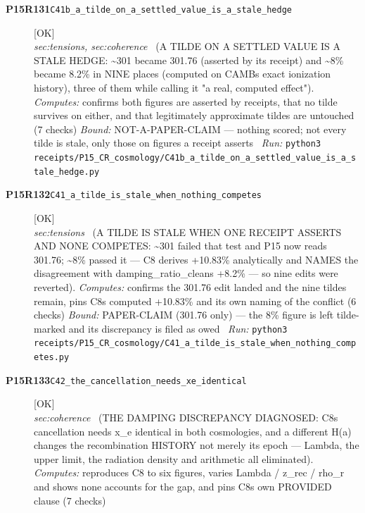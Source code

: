 \begin{description}
\item[\textbf{P15R131}\quad\texttt{C41b\_a\_tilde\_on\_a\_settled\_value\_is\_a\_stale\_hedge}]\hfill\textsf{[OK]}\\
\textit{sec:tensions, sec:coherence} \ (A TILDE ON A SETTLED VALUE IS A STALE HEDGE: \textasciitilde{}301 became 301.76 (asserted by its receipt) and \textasciitilde{}8\% became 8.2\% in NINE places (computed on CAMBs exact ionization history), three of them while calling it "a real, computed effect"). 
\emph{Computes:} confirms both figures are asserted by receipts, that no tilde survives on either, and that legitimately approximate tildes are untouched (7 checks)
 \emph{Bound:} NOT-A-PAPER-CLAIM --- nothing scored; not every tilde is stale, only those on figures a receipt asserts
\ \emph{Run:} \texttt{python3 receipts/P15\_CR\_cosmology/C41b\_a\_tilde\_on\_a\_settled\_value\_is\_a\_stale\_hedge.py}
\item[\textbf{P15R132}\quad\texttt{C41\_a\_tilde\_is\_stale\_when\_nothing\_competes}]\hfill\textsf{[OK]}\\
\textit{sec:tensions} \ (A TILDE IS STALE WHEN ONE RECEIPT ASSERTS AND NONE COMPETES: \textasciitilde{}301 failed that test and P15 now reads 301.76; \textasciitilde{}8\% passed it --- C8 derives +10.83\% analytically and NAMES the disagreement with damping\_ratio\_cleans +8.2\% --- so nine edits were reverted). 
\emph{Computes:} confirms the 301.76 edit landed and the nine tildes remain, pins C8s computed +10.83\% and its own naming of the conflict (6 checks)
 \emph{Bound:} PAPER-CLAIM (301.76 only) --- the 8\% figure is left tilde-marked and its discrepancy is filed as owed
\ \emph{Run:} \texttt{python3 receipts/P15\_CR\_cosmology/C41\_a\_tilde\_is\_stale\_when\_nothing\_competes.py}
\item[\textbf{P15R133}\quad\texttt{C42\_the\_cancellation\_needs\_xe\_identical}]\hfill\textsf{[OK]}\\
\textit{sec:coherence} \ (THE DAMPING DISCREPANCY DIAGNOSED: C8s cancellation needs x\_e identical in both cosmologies, and a different H(a) changes the recombination HISTORY not merely its epoch --- Lambda, the upper limit, the radiation density and arithmetic all eliminated). 
\emph{Computes:} reproduces C8 to six figures, varies Lambda / z\_rec / rho\_r and shows none accounts for the gap, and pins C8s own PROVIDED clause (7 checks)

\end{description}
